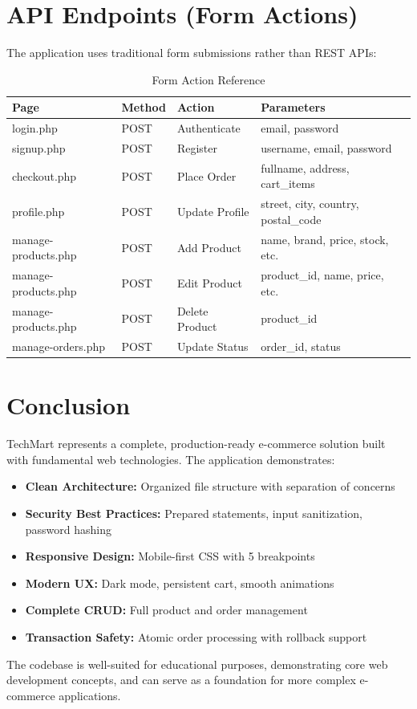 \documentclass[12pt,a4paper]{article}
\begin{document}
\section{API Endpoints (Form Actions)}

The application uses traditional form submissions rather than REST APIs:

\begin{table}[H]
\centering
\begin{tabular}{@{}llll@{}}
\toprule
\textbf{Page} & \textbf{Method} & \textbf{Action} & \textbf{Parameters} \\
\midrule
login.php & POST & Authenticate & email, password \\
signup.php & POST & Register & username, email, password \\
checkout.php & POST & Place Order & fullname, address, cart\_items \\
profile.php & POST & Update Profile & street, city, country, postal\_code \\
manage-products.php & POST & Add Product & name, brand, price, stock, etc. \\
manage-products.php & POST & Edit Product & product\_id, name, price, etc. \\
manage-products.php & POST & Delete Product & product\_id \\
manage-orders.php & POST & Update Status & order\_id, status \\
\bottomrule
\end{tabular}
\caption{Form Action Reference}
\end{table}

\section{Conclusion}

TechMart represents a complete, production-ready e-commerce solution built with fundamental web technologies. The application demonstrates:

\begin{itemize}
    \item \textbf{Clean Architecture:} Organized file structure with separation of concerns
    \item \textbf{Security Best Practices:} Prepared statements, input sanitization, password hashing
    \item \textbf{Responsive Design:} Mobile-first CSS with 5 breakpoints
    \item \textbf{Modern UX:} Dark mode, persistent cart, smooth animations
    \item \textbf{Complete CRUD:} Full product and order management
    \item \textbf{Transaction Safety:} Atomic order processing with rollback support
\end{itemize}

The codebase is well-suited for educational purposes, demonstrating core web development concepts, and can serve as a foundation for more complex e-commerce applications.
\end{document}
